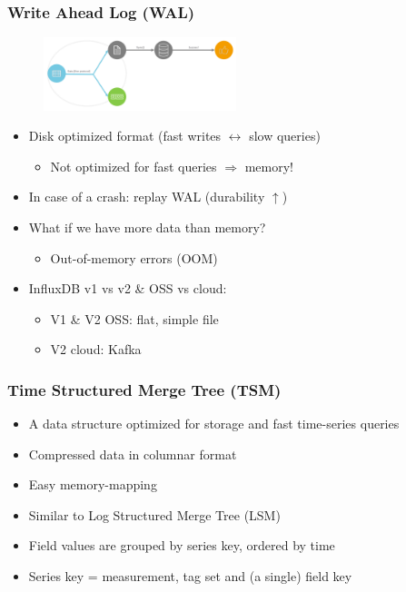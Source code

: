 \documentclass{article}
\begin{document}
\subsubsection{Write Ahead Log (WAL)}

\begin{figure}[H]
    \centering
    \includegraphics[width=0.5\textwidth]{tick-architecture-wal.png}
\end{figure}

\begin{itemize}
    \item Disk optimized format (fast writes $\leftrightarrow$ slow queries)
    \begin{itemize}
        \item Not optimized for fast queries $\Rightarrow$ memory!
    \end{itemize}
    \item In case of a crash: replay WAL (durability $\uparrow$)
    \item What if we have more data than memory?
    \begin{itemize}
        \item Out-of-memory errors (OOM)
    \end{itemize}
    \item InfluxDB v1 vs v2  \& OSS vs cloud:
    \begin{itemize}
        \item V1 \& V2 OSS: flat, simple file
        \item V2 cloud: Kafka
    \end{itemize}
\end{itemize}

\subsubsection{Time Structured Merge Tree (TSM)}

\begin{itemize}
    \item A data structure optimized for storage and fast time-series queries
    \item Compressed data in columnar format
    \item Easy memory-mapping
    \item Similar to Log Structured Merge Tree (LSM)
    \item Field values are grouped by series key, ordered by time
    \item Series key = measurement, tag set and (a single) field key
\end{itemize}
\end{document}
